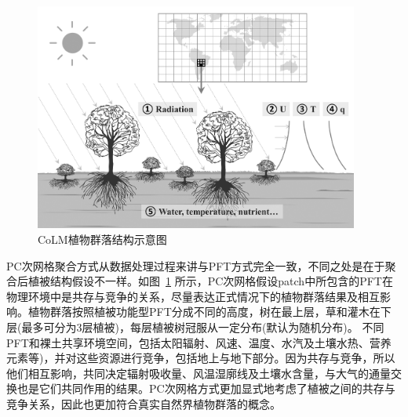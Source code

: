 {
\begin{figure}[htbp]
\centering
\includegraphics[width=0.95\textwidth]{Figures/尺度转换/植物群落结构示意图.png}
\caption{CoLM植物群落结构示意图}
\label{fig:植物群落结构示意图}
\end{figure}
}

PC次网格聚合方式从数据处理过程来讲与PFT方式完全一致，不同之处是在于聚合后植被结构假设不一样。如图~\ref{fig:植物群落结构示意图} 所示，PC次网格假设patch中所包含的PFT在物理环境中是共存与竞争的关系，尽量表达正式情况下的植物群落结果及相互影响。植物群落按照植被功能型PFT分成不同的高度，树在最上层，草和灌木在下层(最多可分为3层植被)，每层植被树冠服从一定分布(默认为随机分布)。 不同PFT和裸土共享环境空间，包括太阳辐射、风速、温度、水汽及土壤水热、营养元素等)，并对这些资源进行竞争，包括地上与地下部分。因为共存与竞争，所以他们相互影响，共同决定辐射吸收量、风温湿廓线及土壤水含量，与大气的通量交换也是它们共同作用的结果。PC次网格方式更加显式地考虑了植被之间的共存与竞争关系，因此也更加符合真实自然界植物群落的概念。
